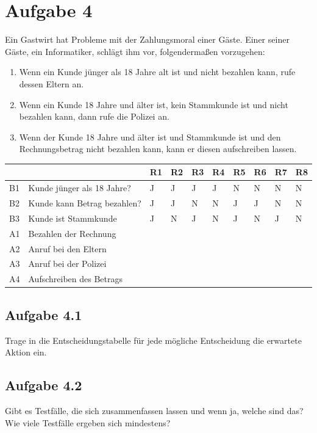 \newpage
\section*{Aufgabe 4}
Ein Gastwirt hat Probleme mit der Zahlungsmoral einer Gäste. Einer seiner Gäste, ein Informatiker, schlägt ihm vor, folgendermaßen vorzugehen:

\begin{enumerate}
\item Wenn ein Kunde jünger als 18 Jahre alt ist und nicht bezahlen kann, rufe dessen Eltern an.
\item Wenn ein Kunde 18 Jahre und älter ist, kein Stammkunde ist und nicht bezahlen kann, dann rufe die Polizei an.
\item Wenn der Kunde 18 Jahre und älter ist und Stammkunde ist und den Rechnungsbetrag nicht bezahlen kann, kann er diesen aufschreiben lassen.
\end{enumerate}

\begin{tabular}{|l|l|l|l|l|l|l|l|l|l|}
\hline
 & & R1 & R2 & R3 & R4 & R5 & R6 & R7 & R8\\\hline \hline
B1 & Kunde jünger als 18 Jahre?  & J & J & J & J & N & N & N & N \\ \hline
B2 & Kunde kann Betrag bezahlen? & J & J & N & N & J & J & N & N \\ \hline 
B3 & Kunde ist Stammkunde        & J & N & J & N & J & N & J & N \\ \hline \hline
A1 & Bezahlen der Rechnung       &   &   &   &   &   &   &   &   \\ \hline 
A2 & Anruf bei den Eltern        &   &   &   &   &   &   &   &   \\ \hline
A3 & Anruf bei der Polizei       &   &   &   &   &   &   &   &   \\ \hline
A4 & Aufschreiben des Betrags    &   &   &   &   &   &   &   &   \\ \hline
\end{tabular}

\subsection*{Aufgabe 4.1}
Trage in die Entscheidungstabelle für jede mögliche Entscheidung die erwartete Aktion ein.

\subsection*{Aufgabe 4.2}
Gibt es Testfälle, die sich zusammenfassen lassen und wenn ja, welche sind das? Wie viele Testfälle ergeben sich mindestens?


